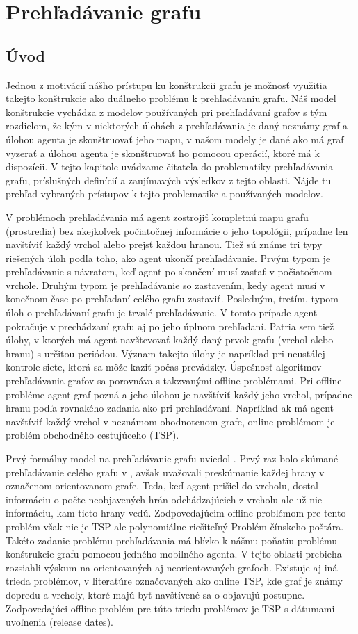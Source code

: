 \chapter{Prehľadávanie grafu}
\thispagestyle{empty}
\section{Úvod}
Jednou z motivácií nášho prístupu ku konštrukcii grafu je možnosť využitia
takejto konštrukcie ako duálneho problému k prehľadávaniu grafu. Náš model
konštrukcie vychádza z modelov používaných pri prehľadávaní grafov s tým
rozdielom, že kým v niektorých úlohách z prehľadávania je daný neznámy graf
a úlohou agenta je skonštruovať jeho mapu, v našom modely je dané ako má
graf vyzerať a úlohou agenta je skonštruovať ho pomocou operácií, ktoré má k
dispozícii.
V tejto kapitole uvádzame čitateľa do problematiky prehľadávania grafu, 
príslušných definícií a zaujímavých výsledkov z tejto oblasti. Nájde tu
prehľad vybraných prístupov k tejto problematike a používaných modelov.

V problémoch prehľadávania má agent zostrojiť kompletnú mapu grafu 
(prostredia) bez akejkoľvek počiatočnej informácie o jeho topológii,
prípadne len navštíviť každý vrchol alebo prejsť každou hranou.
Tiež sú známe tri typy riešených úloh podľa toho, ako agent ukončí
prehľadávanie. Prvým typom je prehľadávanie s návratom, keď agent po
skončení musí zastať v počiatočnom vrchole. Druhým typom je prehľadávanie so
zastavením, kedy agent musí v konečnom čase po prehľadaní celého grafu
zastaviť. Posledným, tretím, typom úloh o prehľadávaní grafu je trvalé
prehľadávanie. V tomto prípade agent pokračuje v prechádzaní grafu aj po
jeho úplnom prehľadaní. Patria sem tiež úlohy, v ktorých má agent
navštevovať každý daný prvok grafu (vrchol alebo hranu) s určitou periódou.
Význam takejto úlohy je napríklad pri neustálej kontrole siete, ktorá sa
môže kaziť počas prevádzky.
Úspešnosť algoritmov prehľadávania grafov sa porovnáva s takzvanými offline
problémami. Pri offline probléme agent graf pozná a jeho úlohou je navštíviť
každý jeho vrchol, prípadne hranu podľa rovnakého zadania ako pri
prehľadávaní. Napríklad ak má agent navštíviť každý vrchol v neznámom
ohodnotenom grafe, online problémom je problém obchodného cestujúceho (TSP).

Prvý formálny model na prehľadávanie grafu uviedol \cite{SPWM}.
Prvý raz bolo skúmané prehľadávanie celého grafu v \cite{EUG}, 
avšak uvažovali preskúmanie každej hrany v označenom orientovanom grafe. 
Teda, keď agent prišiel do vrcholu, dostal informáciu o počte neobjavených
hrán odchádzajúcich z vrcholu ale už nie informáciu, kam tieto hrany vedú.
Zodpovedajúcim offline problémom pre tento problém však nie je TSP 
ale polynomiálne riešiteľný Problém čínskeho poštára.
Takéto zadanie problému prehľadávania má blízko k nášmu poňatiu 
problému konštrukcie grafu pomocou jedného mobilného agenta. V tejto oblasti
prebieha rozsiahli výskum na orientovaných aj neorientovaných grafoch.
Existuje aj iná trieda problémov, v literatúre označovaných ako online TSP, 
kde graf je známy dopredu a vrcholy, ktoré majú byť navštívené sa o
objavujú postupne. 
Zodpovedajúci offline problém pre túto triedu problémov je TSP s dátumami
uvoľnenia (release dates).

